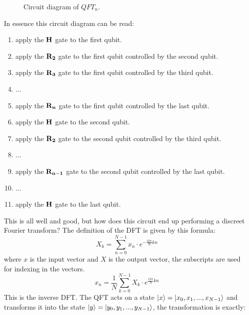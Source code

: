 \begin{figure}[H]
{
    }
    \caption{Circuit diagram of $QFT_n$.}
    \label{fig:QTF_n}
\end{figure}
In essence this circuit diagram can be read:
\begin{enumerate}
    \item apply the $\mathbf{H}$ gate to the first qubit. 
    \item apply the $\mathbf{R_{2}}$ gate to the first qubit controlled by the second qubit. 
    \item apply the $\mathbf{R_{3}}$ gate to the first qubit controlled by the third qubit. 
    \item ... 
    \item apply the $\mathbf{R_{n}}$ gate to the first qubit controlled by the last qubit. 
    \item apply the $\mathbf{H}$ gate to the second qubit. 
    \item apply the $\mathbf{R_{2}}$ gate to the second qubit controlled by the third qubit. 
    \item ... 
    \item apply the $\mathbf{R_{n-1}}$ gate to the second qubit controlled by the last qubit. 
    \item ... 
    \item apply the $\mathbf{H}$ gate to the last qubit. 
\end{enumerate}
This is all well and good, but how does this circuit end up performing a discreet Fourier transform? The definition of the DFT is given by this formula:
$$X_{k}=\sum _{n=0}^{N-1}x_{n}\cdot e^{-{\frac {i2\pi }{N}}kn}$$
where $x$ is the input vector and $X$ is the output vector, the subscripts are used for indexing in the vectors. 
$$x_{n}={\frac {1}{N}}\sum _{k=0}^{N-1}X_{k}\cdot e^{{\frac {i2\pi }{N}}kn}$$
This is the inverse DFT.
The QFT acts on a state $\ket{x}=\ket{x_0,x_1,...,x_{N-1}}$ and transforms it into the state $\ket{y}=\ket{y_0,y_1,...,y_{N-1}}$, the transformation is exactly: 
